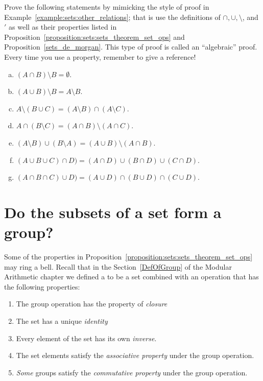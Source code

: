 \begin{exercise}\label{exercise:sets:30}
Prove the following statements by mimicking the style of proof in Example~\ref{example:sets:other_relations}; that is use the definitions of $\cap, \cup, \setminus$, and $'$ as well as their properties listed in Proposition~\ref{proposition:sets:sets_theorem_set_ops} and  Proposition~\ref{sets_de_morgan}. This type of proof is called an ``algebraic'' proof.  Every time you use a property, remember to give a reference!
\begin{enumerate}[(a)]
\item
$(A \cap B) \setminus B = \emptyset$.
\item
$(A \cup B) \setminus B = A \setminus B$.
\item
$A \setminus (B \cup C) = (A \setminus B) \cap (A \setminus C)$. 
\item
 $A \cap (B \setminus C) = (A \cap B) \setminus (A \cap C)$. 
\item
$(A \setminus B) \cup (B \setminus A) = (A \cup B) \setminus (A \cap B)$. 
\item
$(A \cup B \cup C) \cap D) = (A \cap D) \cup (B \cap D)\cup (C \cap D)$. 
\item
$(A \cap B \cap C) \cup D) = (A \cup D) \cap (B \cup D)\cap (C \cup D)$. 
\end{enumerate}
\end{exercise}

\section{Do the subsets of a set form a group?}\label{SetGroup} 
Some of the properties in Proposition~\ref{proposition:sets:sets_theorem_set_ops} may ring a bell. Recall that in the Section~\ref{DefOfGroup} of the Modular Arithmetic chapter  we defined a  to be a set combined with an operation that has the following properties:
\begin{enumerate}
\item
The group operation has the property of \emph{closure}
\item
The set has  a unique \emph{identity}
\item
Every element of the set has its own \emph{inverse}.
\item
The set elements satisfy the \emph{associative property} under the group operation.
\item
\emph{Some} groups satisfy the \emph{commutative property} under the group operation.
\end{enumerate}

